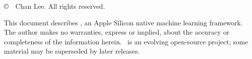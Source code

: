 \thispagestyle{empty}

\vspace*{\fill}

\noindent\copyright\ \the\year\ Chan Lee. All rights reserved.

\vspace{1em}

\noindent
This document describes \Lucid, an Apple Silicon native machine learning framework. The author makes no warranties, express or implied, about the accuracy or completeness of the information herein. \Lucid\ is an evolving open-source project; some material may be superseded by later releases.

\clearpage
